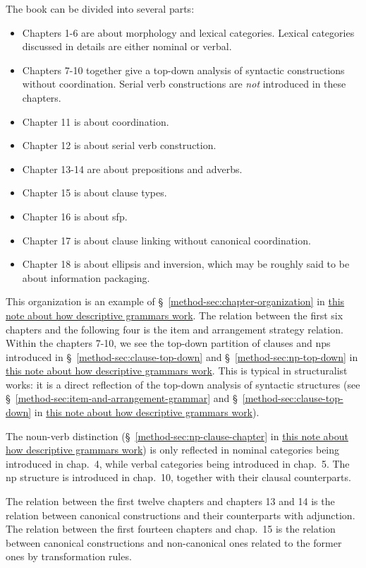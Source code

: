\documentclass[UTF8, a4paper, oneside, scheme=plain]{ctexart}
\newcommand*{\citesec}[1]{\S~{#1}}
\newcommand*{\citechap}[1]{chap.~{#1}}
\newcommand{\method}{\href{../methodology/glossing.pdf}{this note about how descriptive grammars work}}
\begin{document}
The book can be divided into several parts:
\begin{itemize}
    \item Chapters 1-6 are about morphology and lexical categories.
    Lexical categories discussed in details are either nominal or verbal.
    \item Chapters 7-10 together give a top-down analysis of syntactic constructions without coordination.
    Serial verb constructions are \emph{not} introduced in these chapters.
    \item Chapter 11 is about coordination.
    \item Chapter 12 is about serial verb construction.
    \item Chapter 13-14 are about prepositions and adverbs.
    \item Chapter 15 is about clause types.
    \item Chapter 16 is about \ac{sfp}.
    \item Chapter 17 is about clause linking without canonical coordination.
    \item Chapter 18 is about ellipsis and inversion, 
    which may be roughly said to be about information packaging. 
\end{itemize}

This organization is an example of \citesec{\ref{method-sec:chapter-organization}} in \method.
The relation between the first six chapters and the following four 
is the item and arrangement strategy relation.
Within the chapters 7-10,
we see the top-down partition of clauses and \acs{np}s 
introduced in \citesec{\ref{method-sec:clause-top-down}}
and \citesec{\ref{method-sec:np-top-down}} in \method.
This is typical in structuralist works:
it is a direct reflection of the top-down analysis of syntactic structures 
(see \citesec{\ref{method-sec:item-and-arrangement-grammar}} and \citesec{\ref{method-sec:clause-top-down}}
in \method).

The noun-verb distinction (\citesec{\ref{method-sec:np-clause-chapter}} in \method) 
is only reflected in 
nominal categories being introduced in \citechap{4},
while verbal categories being introduced in \citechap{5}.
The \ac{np} structure is introduced in \citechap{10},
together with their clausal counterparts.


The relation between the first twelve chapters and chapters 13 and 14
is the relation between canonical constructions and their counterparts with adjunction.
The relation between the first fourteen chapters and \citechap{15} is 
the relation between canonical constructions and non-canonical ones
related to the former ones by transformation rules.
\end{document}
